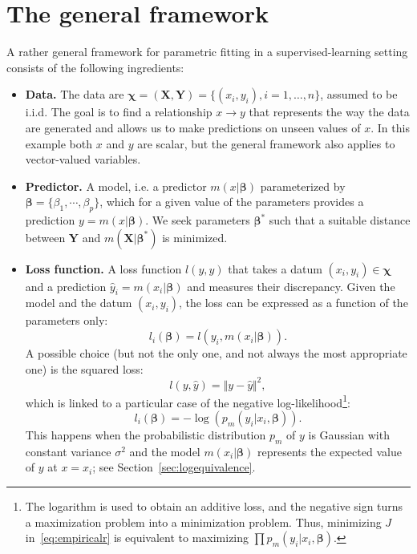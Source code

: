 \documentclass{article}
\begin{document}
\section{The general framework}
A rather general framework for parametric fitting in a supervised-learning setting consists of the following ingredients:
\begin{itemize}
  \item \textbf{Data.} The data are $\boldsymbol{\chi}=(\mathbf{X},\mathbf{Y})=\lbrace(x_i,y_i),i=1,\ldots,n\rbrace$, assumed to be i.i.d. The goal is to find a relationship $x \to y$ that represents the way the data are generated and allows us to make predictions on unseen values of $x$. In this example both $x$ and $y$ are scalar, but the general framework also applies to vector-valued variables.
  \item \textbf{Predictor.} A model, i.e. a predictor $m(x|\boldsymbol{\beta})$ parameterized by $\boldsymbol{\beta}= \lbrace\beta_1,\cdots,\beta_p\rbrace$, which for a given value of the parameters provides a prediction $y=m(x|\boldsymbol{\beta})$. We seek parameters $\boldsymbol{\beta}^*$ such that a suitable distance between $\boldsymbol{Y}$ and $m(\boldsymbol{X}|\boldsymbol{\beta}^*)$ is minimized.
  \item \textbf{Loss function.} A loss function $l(y,\hat{y})$ that takes a datum $(x_i,y_i)\in\boldsymbol{\chi}$ and a prediction $\hat{y}_i=m(x_i|\boldsymbol{\beta})$ and measures their discrepancy. Given the model and the datum $(x_i,y_i)$, the loss can be expressed as a function of the parameters only:
  \begin{equation}\label{eq:lossfun}
    l_i(\boldsymbol{\beta})=l(y_i,m(x_i|\boldsymbol{\beta})).
  \end{equation}
  A possible choice (but not the only one, and not always the most appropriate one) is the squared loss:
  \[
    l(y,\hat{y})=\Vert y-\hat{y}\Vert^2,
  \]
  which is linked to a particular case of the negative log-likelihood\footnote{The logarithm is used to obtain an additive loss, and the negative sign turns a maximization problem into a minimization problem. Thus, minimizing $J$ in~\eqref{eq:empiricalr} is equivalent to maximizing $\prod p_m(y_i|x_i,\boldsymbol{\beta})$.}:
  \begin{equation}\label{eq:lossfunnl}
    l_i(\boldsymbol{\beta})=-\log(p_m(y_i|x_i,\boldsymbol{\beta})).
  \end{equation}
  This happens when the probabilistic distribution $p_m$ of $y$ is Gaussian with constant variance $\sigma^2$ and the model $m(x_i|\boldsymbol{\beta})$ represents the expected value of $y$ at $x=x_i$; see Section~\ref{sec:logequivalence}.

\end{itemize}
\end{document}
